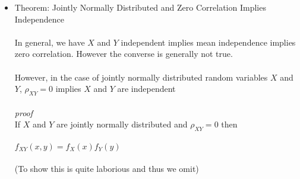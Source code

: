 \documentclass{article}
\begin{document}
\begin{itemize}
    \item Theorem: Jointly Normally Distributed and Zero Correlation Implies Independence\\\\
    In general, we have $X$ and $Y$ independent implies mean independence implies zero correlation.  However the converse is generally not true.\\\\
    However, in the case of jointly normally distributed random variables $X$ and $Y$, $\rho_{XY}=0$ implies $X$ and $Y$ are independent\\\\
    \emph{proof}\\
    If $X$ and $Y$ are jointly normally distributed and $\rho_{XY}=0$ then\\\\
    $f_{XY}(x,y)=f_X(x)f_Y(y)$\\\\
    (To show this is quite laborious and thus we omit)\\
\end{itemize}
\pagebreak
\end{document}
